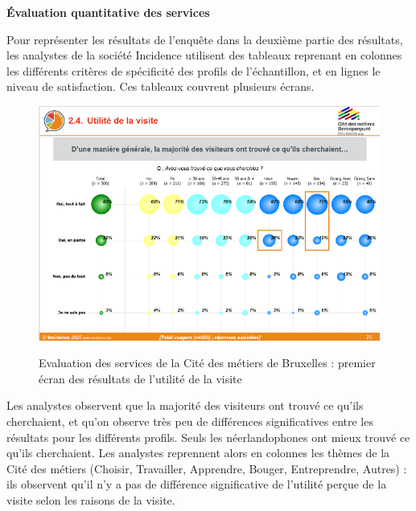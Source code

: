 \documentclass[french,a4paper,12pt]{article}
\begin{document}
\textbf{Évaluation quantitative des services}

\quad Pour représenter les résultats de l’enquête dans la deuxième partie des résultats, les analystes de la société Incidence utilisent des tableaux reprenant en colonnes les différents critères de spécificité des profils de l’échantillon, et en lignes le niveau de satisfaction. Ces tableaux couvrent plusieurs écrans.

\begin{center}
\begin{figure}
\includegraphics[scale=1.5]{9-cdm-utilite.PNG}
\end{figure}
\begin{figure}[h]
\caption{Evaluation des services de la Cité des métiers de Bruxelles : premier écran des résultats de l'utilité de la visite}
\end{figure}
\end{center}

\quad Les analystes observent que la majorité des visiteurs ont trouvé ce qu’ils cherchaient, et qu’on observe très peu de différences significatives entre les résultats pour les différents profils. Seuls les néerlandophones ont mieux trouvé ce qu’ils cherchaient. Les analystes reprennent alors en colonnes les thèmes de la Cité des métiers (Choisir, Travailler, Apprendre, Bouger, Entreprendre, Autres) : ils observent qu’il n’y a pas de différence significative de l’utilité perçue de la visite selon les raisons de la visite. 
\end{document}
